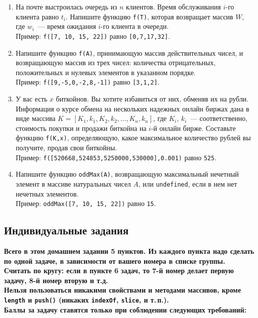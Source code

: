 \documentclass{article}
\begin{document}
\begin{enumerate}[label=0.\theenumi.]
\item 
На почте выстроилась очередь из $n$ клиентов. Время обслуживания $i$-го клиента равно $t_i$. Напишите функцию \texttt{f(T)}, которая возвращает массив $W$, где  $w_i$~--- время ожидания $i$-го клиента в очереди.
\\Пример: \texttt{f([7, 10, 15, 22])} равно \texttt{[0,7,17,32]}.

\item 
Напишите функцию \texttt{f(A)}, принимающую массив действительных чисел, и возвращающую массив из трех чисел: количества отрицательных, положительных и нулевых элементов в указанном порядке. 
\\Пример: \texttt{f([9,-5,0,-2,8,-1])} равно \texttt{[3,1,2]}.

\item 
У вас есть $x$ биткойнов. Вы хотите избавиться от них, обменяв их на рубли. Информация о курсе обмена на нескольких надежных онлайн биржах дана в виде массива $K = [K_1,k_1,K_2,k_2,\ldots,K_n,k_n]$, где $K_i$, $k_i$~--- соответственно, стоимость покупки и продажи биткойна на $i$-й онлайн бирже. Составьте функцию \texttt{f(K,x)}, определяющую, какое максимальное количество рублей вы получите, продав свои биткойны.
\\Пример: \texttt{f([520668,524853,5250000,530000],0.001)} равно \texttt{525}.

\item 
Напишите функцию \texttt{oddMax(A)}, возвращающую максимальный нечетный элемент в массиве натуральных чисел $A$, или \texttt{undefined}, если в нем нет нечетных элементов.
\\Пример: \texttt{oddMax([7, 10, 15, 22])} равно \texttt{15}.
\end{enumerate}

\newpage

\begin{center}
\subsection*{Индивидуальные задания}
\end{center}

\noindent \textbf{Всего в этом домашнем задании 5 пунктов. Из каждого пункта надо сделать по одной задаче, в зависимости от вашего номера в списке группы. Считать по кругу: если в пункте 6 задач, то 7-й номер делает первую задачу, 8-й номер вторую и т.д.}
{
    \color{red}
    \bf
    \\[1.5mm]
    Нельзя пользоваться никакими свойствами и методами массивов, кроме \texttt{length} и \texttt{push()} (никаких \texttt{indexOf}, \texttt{slice}, и т.\,п.).
    \\[1.5mm]
    Баллы за задачу ставятся только при соблюдении следующих требований:
}
\end{document}

